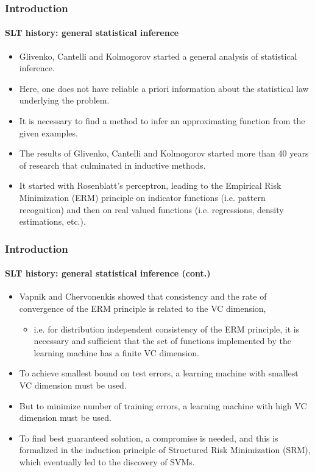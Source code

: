 \begin{frame}
\frametitle{Introduction}
\framesubtitle{SLT history: general statistical inference}
\logoCSIPCPL\mypagenum
	\begin{itemize}
		\item Glivenko, Cantelli and Kolmogorov started a general analysis of statistical inference.  
		\item Here, one does not have reliable a priori information about the statistical law underlying the problem.  
		\item It is necessary to find a method to infer an approximating function from the given examples.  
		\item The results of Glivenko, Cantelli and Kolmogorov started more than 40 years of research that culminated in inductive methods.   
		\item It started with Rosenblatt's perceptron, leading to the Empirical Risk Minimization (ERM) principle on indicator functions (i.e. pattern recognition) and then on real valued functions (i.e. regressions, density estimations, etc.).  
	\end{itemize}
\end{frame}



\begin{frame}
\frametitle{Introduction}
\framesubtitle{SLT history: general statistical inference (cont.)}
\logoCSIPCPL\mypagenum
	\begin{itemize}
		\item Vapnik and Chervonenkis showed that consistency and the rate of convergence of the ERM principle is related to the VC dimension, 
			\begin{itemize}
				\item i.e. for distribution independent consistency of the ERM principle, it is necessary and sufficient that the set of functions implemented by the learning machine has a finite VC dimension.  
			\end{itemize}
		\item To achieve smallest bound on test errors, a learning machine with smallest VC dimension must be used.  
		\item But to minimize number of training errors, a learning machine with high VC dimension must be used.  
		\item To find best guaranteed solution, a compromise is needed, and this is formalized in the induction principle of Structured Risk Minimization (SRM), which eventually led to the discovery of SVMs.
	\end{itemize}
\end{frame}


